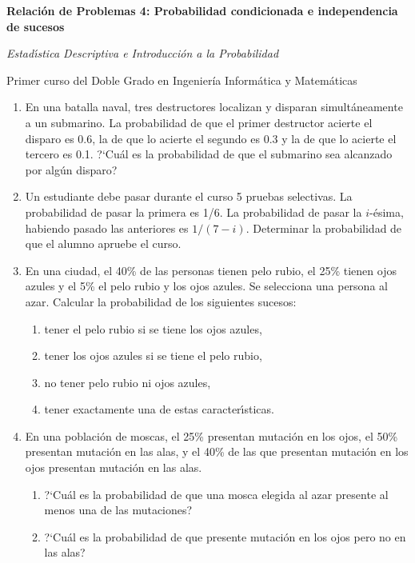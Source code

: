 \documentclass[11pt]{book}
\begin{document}
\centerline{\large \bf Relaci{\'o}n de Problemas 4: Probabilidad condicionada e independencia
de sucesos}
\smallskip \centerline{\large \it Estad{\'\i}stica Descriptiva e Introducci{\'o}n a la
Probabilidad}

\centerline{Primer curso del Doble Grado en Ingenier\'ia Inform\'atica y Matem{\'a}ticas}
\hrulefill \vskip 0.5cm

\begin{enumerate}



\item  En una batalla naval, tres destructores localizan y disparan simult{\'a}neamente a  un
    submarino. La proba\-bi\-li\-dad de que el primer  destructor  acierte el disparo es 0.6,  la de que lo acierte el segundo es 0.3 y  la  de  que  lo
    acierte el tercero es 0.1. ?`Cu{\'a}l es la probabilidad  de  que  el  submarino  sea alcanzado por alg{\'u}n disparo?

\item  Un estudiante debe  pasar durante el curso  5  pruebas  selectivas.  La
    probabilidad de pasar la primera es 1/6. La probabilidad  de  pasar  la
    $i$-{\'e}sima, habiendo pasado  las  anteriores  es  $1/(7-i)$.  Determinar  la
    probabilidad de que el alumno apruebe el curso.

\item  En una ciudad, el 40\% de las personas tienen pelo rubio, el 25\%  tienen
    ojos azules y el 5\% el pelo rubio y los ojos azules. Se selecciona  una
    persona al azar. Calcular la probabilidad de los siguientes sucesos:
    \begin{enumerate}
      \item tener el pelo rubio si se tiene los ojos azules,
      \item tener los ojos azules si se tiene el pelo rubio,
      \item no tener pelo rubio ni ojos azules,
      \item tener exactamente una de estas caracter{\'\i}sticas.
    \end{enumerate}

\item  En una poblaci{\'o}n de moscas, el 25\% presentan mutaci{\'o}n  en  los
    ojos, el 50\% presentan mutaci{\'o}n en las  alas,  y  el  40\%  de  las  que
    presentan mutaci{\'o}n en los ojos presentan mutaci{\'o}n en las alas.
    \begin{enumerate}
      \item ?`Cu{\'a}l es la probabilidad de que una mosca elegida al  azar  presente
            al menos una de las mutaciones?
      \item ?`Cu{\'a}l es la probabilidad de que   presente  mutaci{\'o}n
            en los ojos pero no en las alas?
    \end{enumerate}


\end{enumerate}
\end{document}
